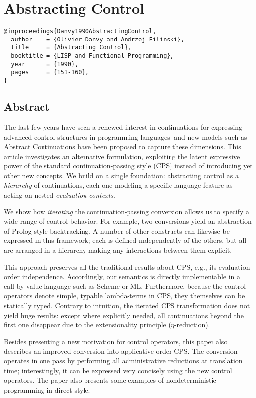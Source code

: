 \documentclass[letterpaper]{llncs}
\begin{document}
\section*{Abstracting Control}%

\begin{verbatim}
@inproceedings{Danvy1990AbstractingControl,
  author    = {Olivier Danvy and Andrzej Filinski},
  title     = {Abstracting Control},
  booktitle = {LISP and Functional Programming},
  year      = {1990},
  pages     = {151-160},
}
\end{verbatim}


\subsection*{Abstract}
The last few years have seen a renewed interest in continuations for expressing advanced control structures in programming languages, and new models such as Abstract Continuations have been proposed to capture these dimensions. This article investigates an alternative formulation, exploiting the latent expressive power of the standard continuation-passing style (CPS) instead of introducing yet other new concepts. We build on a single foundation: abstracting control as a \textit{hierarchy} of continuations, each one modeling a specific language feature as acting on nested \textit{evaluation contexts}. 

We show how \textit{iterating} the continuation-passing conversion allows us to specify a wide range of control behavior. For example, two conversions yield an abstraction of Prolog-style backtracking. A number of other constructs can likewise be expressed in this framework; each is defined independently of the others, but all are arranged in a hierarchy making any interactions between them explicit. 

This approach preserves all the traditional results about CPS, e.g., its evaluation order independence. Accordingly, our semantics is directly implementable in a call-by-value language such as Scheme or ML. Furthermore, because the control operators denote simple, typable lambda-terms in CPS, they themselves can be statically typed. Contrary to intuition, the iterated CPS transformation does not yield huge results: except where explicitly needed, all continuations beyond the first one disappear due to the extensionality principle ($\eta$-reduction). 

Besides presenting a new motivation for control operators, this paper also describes an improved conversion into applicative-order CPS. The conversion operates in one pass by performing all administrative reductions at translation time; interestingly, it can be expressed very concisely using the new control operators. The paper also presents some examples of nondeterministic programming in direct style.  









\end{document}
